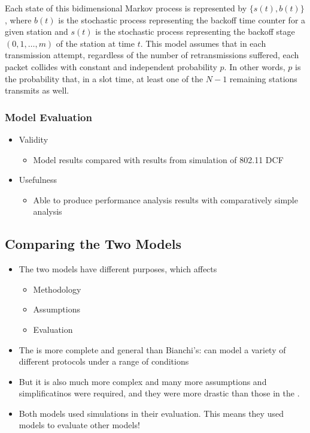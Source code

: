 Each state of this bidimensional Markov process is represented by $\lbrace s(t), b(t) \rbrace$, where $b(t)$ is the stochastic process representing the backoff time counter for a given station and $s(t)$ is the stochastic process representing the backoff stage $(0, 1, \ldots, m)$ of the station at time $t$.
This model assumes that in each transmission attempt, regardless of the number of retransmissions suffered, each packet collides with constant and independent probability $p$.
In other words, $p$ is the probability that, in a slot time, at least one of the $N - 1$ remaining stations transmits as well.

\subsubsection{Model Evaluation}\label{subsubsec:Bianchi_Model_Eval}
\begin{itemize}[noitemsep]
\item Validity
  \begin{itemize}[noitemsep]
  \item Model results compared with results from simulation of 802.11 DCF
  \end{itemize}

\item Usefulness
  \begin{itemize}[noitemsep]
  \item Able to produce performance analysis results with comparatively simple analysis
  \end{itemize}
\end{itemize}

\subsection{Comparing the Two Models}\label{subsec:Comparing_CSMA_Models}
\begin{itemize}[noitemsep]
\item The two models have different purposes, which affects
  \begin{itemize}[noitemsep]
  \item Methodology
  \item Assumptions
  \item Evaluation
\end{itemize}

\item The  is more complete and general than Bianchi’s: can model a variety of different protocols under a range of conditions
\item But it is also much more complex and many more assumptions and simplificatinos were required, and they were more drastic than those in the .
\item Both models used simulations in their evaluation. This means they used models to evaluate other models!
\end{itemize}

